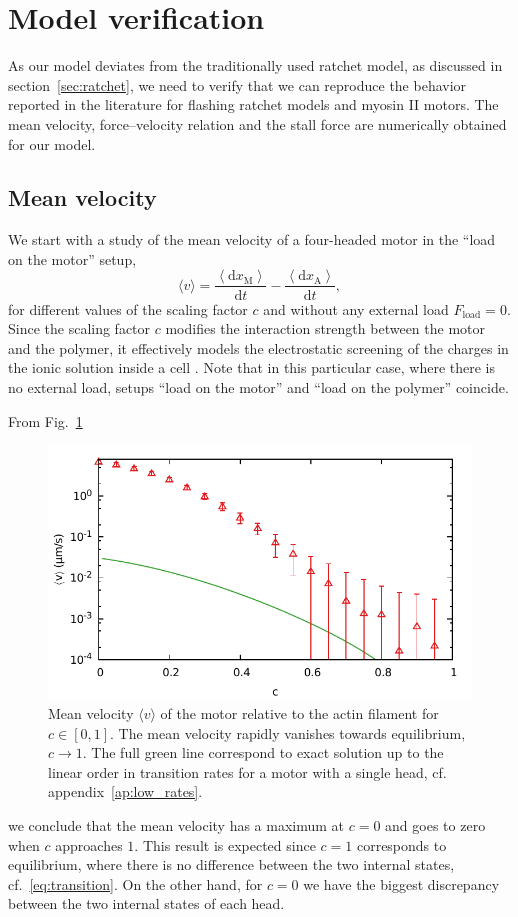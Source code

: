 \documentclass[aps,pre,twocolumn,showpacs,showkeys,superscriptaddress,floatfix]{revtex4-1}
\newcommand{\rmd}{{\mathrm d}}
\begin{document}
\section{Model verification}
\label{sec:model_verification}
As our model deviates from the traditionally used ratchet model, as discussed in section~\ref{sec:ratchet},  
we need to verify that we can reproduce the behavior reported in the literature for flashing ratchet models and myosin II motors. 
The mean velocity, force--velocity relation and the stall force are numerically obtained for our model.

\subsection{Mean velocity}
\label{sec:velocity}
We start with a study of the mean velocity of a four-headed motor in the ``load on the motor'' setup,
\begin{equation}
\langle v \rangle 
= \frac{ \left\langle \rmd x_\text{M} \right\rangle }{ \rmd t } 
- \frac{ \left\langle \rmd x_\text{A} \right\rangle }{ \rmd t } ,
\label{eq:mean_velocity} 
\end{equation}
for different values of the scaling factor $c$ and without any external load $F_\text{load} = 0$.
Since the scaling factor $c$ modifies the interaction strength between the motor and the polymer, it effectively models the electrostatic screening of the charges in the ionic solution inside a cell \cite{barterls1993myosin}.
Note that in this particular case, where there is no external load, setups ``load on the motor'' and ``load on the polymer'' coincide. 

From Fig.~\ref{fig:c_v}
\begin{figure}[t]
\centering
\includegraphics[width=0.9\linewidth,height=!]{c_v_4heads}
\caption{
\label{fig:c_v}
Mean velocity $\langle v \rangle$ of the motor relative to the actin filament for $c \in [0,1]$.
The mean velocity rapidly vanishes towards equilibrium, $c \to 1$.  
The full green line correspond to exact solution up to the linear order in transition rates for a motor with a single head, cf. appendix~\ref{ap:low_rates}.
} 
\end{figure}
we conclude that the mean velocity has a maximum at $c=0$ and goes to zero when $c$ approaches $1$. 
This result is expected since $c=1$ corresponds to equilibrium, where there is no difference between the two internal states, cf.~\eqref{eq:transition}.
On the other hand, for $c=0$ we have the biggest discrepancy between the two internal states of each head. 
\end{document}
